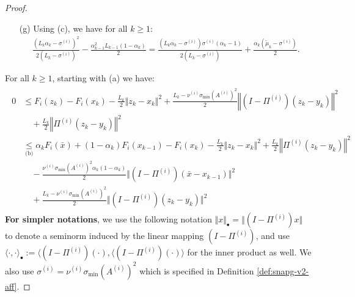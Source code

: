 \documentclass[12pt]{article}
\begin{document}
\begin{proof}
\begin{itemize}
            \item [(g)] Using (c), we have for all $k \ge 1$: 
            \begin{align*}
                \frac{\left(
                    L_k\alpha_k - \sigma^{(i)}
                \right)^2}{2(L_k - \sigma^{(i)})} 
                -
                \frac{\alpha_{k - 1}^2L_{k - 1}(1 - \alpha_k)}{2} 
                = 
                \frac{
                \left(L_k \alpha_k - \sigma^{(i)}\right)\sigma^{(i)}
                \left(\alpha_k - 1\right)
                }
                {2(L_k - \sigma^{(i)})}
                + \frac{\alpha_k(\tilde \mu_k - \sigma^{(i)})}{2}. 
            \end{align*}
        \end{itemize}
        For all $k \ge 1$, starting with (a) we have: 
        \begin{align}\label{ineq:snapg2-one-step-s1-chain1}
            \begin{split}
                0 &\le F_i(z_k) - F_i(x_k) - 
                \frac{L_k}{2}\Vert z_k - x_k\Vert^2 
                + \frac{L_k - \nu^{(i)}\sigma_{\min}(A^{(i)})^2}{2}\left\Vert (I - \Pi^{(i)}) (z_k - y_k)\right\Vert^2
                    \\ &\quad 
                    + \frac{L_k}{2}\left\Vert \Pi^{(i)}(z_k - y_k)\right\Vert^2
                \\
                &\underset{\text{(b)}}{\le}
                \alpha_k F_i(\bar x) + (1 - \alpha_k)F_i(x_{k - 1}) - F_i(x_k)     
                - \frac{L_k}{2}\Vert z_k - x_k\Vert^2 
                + \frac{L_k}{2}\left\Vert \Pi^{(i)}(z_k - y_k)\right\Vert^2
                    \\&\quad 
                    - \frac{\nu^{(i)}\sigma_{\min}(A^{(i)})^2\alpha_k(1 - \alpha_k)}{2}\Vert (I - \Pi^{(i)})(\bar x - x_{k - 1})\Vert^2
                    \\&\quad
                    + \frac{L_k - \nu^{(i)}\sigma_{\min}(A^{(i)})^2}{2}\Vert (I - \Pi^{(i)})(z_k - y_k)\Vert^2
            \end{split}
        \end{align}
        \textbf{For simpler notations}, we use the following notation $\Vert x\Vert_{\bullet} = \Vert (I - \Pi^{(i)})x\Vert$ to denote a seminorm induced by the linear mapping $(I - \Pi^{(i)})$, and use $\langle \cdot,\cdot\rangle_\bullet := \langle (I - \Pi^{(i)})(\cdot), \langle (I - \Pi^{(i)})(\cdot)\rangle$ for the inner product as well. 
        We also use $\sigma^{(i)} = \nu^{(i)}\sigma_{\min}(A^{(i)})^2$ which is specified in Definition \ref{def:snapg-v2-aff}. 

\end{proof}
\end{document}
